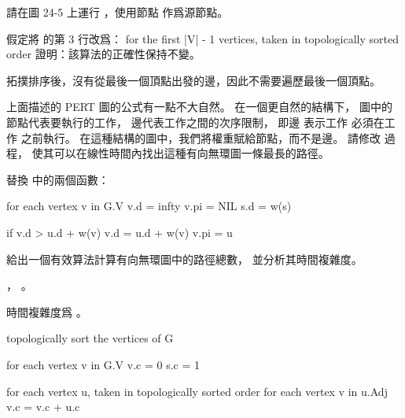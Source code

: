\startsection[
  title={Single-source shortest paths in directed acyclic graphs},
]

\startEXERCISE
請在圖 24-5 上運行 ，使用節點  作爲源節點。
\stopEXERCISE

\startANSWER
\externalfigure[output/e24_2_1-6]
\stopANSWER

\startEXERCISE
假定將  的第 3 行改爲：
\startCLRS
for the first |V| - 1 vertices, taken in topologically sorted order
\stopCLRS
證明：該算法的正確性保持不變。
\stopEXERCISE

\startANSWER
拓撲排序後，沒有從最後一個頂點出發的邊，因此不需要遍歷最後一個頂點。
\stopANSWER

\startEXERCISE
上面描述的 PERT 圖的公式有一點不大自然。
在一個更自然的結構下，
圖中的節點代表要執行的工作，
邊代表工作之間的次序限制，
即邊  表示工作  必須在工作  之前執行。
在這種結構的圖中，我們將權重賦給節點，而不是邊。
請修改  過程，
使其可以在線性時間內找出這種有向無環圖一條最長的路徑。
\stopEXERCISE

\startANSWER
替換  中的兩個函數：

\startCLRS
for each vertex v in G.V
	v.d = infty
	v.pi = NIL
s.d = w(s)
\stopCLRS

\startCLRS
if v.d > u.d + w(v)
	v.d = u.d + w(v)
	v.pi = u
\stopCLRS
\stopANSWER

\startEXERCISE
給出一個有效算法計算有向無環圖中的路徑總數，
並分析其時間複雜度。
\stopEXERCISE

\startANSWER
{}， 。

時間複雜度爲 。

\startCLRS
topologically sort the vertices of G

for each vertex v in G.V
	v.c = 0
s.c = 1

for each vertex u, taken in topologically sorted order
	for each vertex v in u.Adj
		v.c = v.c + u.c
\stopCLRS
\stopANSWER

\stopsection
